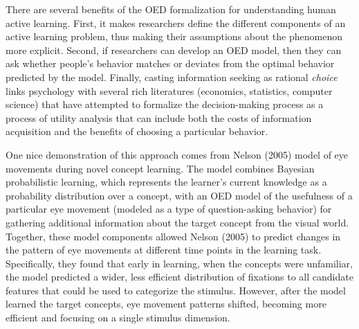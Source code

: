 \documentclass[english,man]{apa6}
\theoremstyle{definition}
\theoremstyle{definition}
\theoremstyle{definition}
\theoremstyle{remark}
\begin{document}
There are several benefits of the OED formalization for understanding
human active learning. First, it makes researchers define the different
components of an active learning problem, thus making their assumptions
about the phenomenon more explicit. Second, if researchers can develop
an OED model, then they can ask whether people's behavior matches or
deviates from the optimal behavior predicted by the model. Finally,
casting information seeking as rational \emph{choice} links psychology
with several rich literatures (economics, statistics, computer science)
that have attempted to formalize the decision-making process as a
process of utility analysis that can include both the costs of
information acquisition and the benefits of choosing a particular
behavior.

One nice demonstration of this approach comes from Nelson (2005) model
of eye movements during novel concept learning. The model combines
Bayesian probabilistic learning, which represents the learner's current
knowledge as a probability distribution over a concept, with an OED
model of the usefulness of a particular eye movement (modeled as a type
of question-asking behavior) for gathering additional information about
the target concept from the visual world. Together, these model
components allowed Nelson (2005) to predict changes in the pattern of
eye movements at different time points in the learning task.
Specifically, they found that early in learning, when the concepts were
unfamiliar, the model predicted a wider, less efficient distribution of
fixations to all candidate features that could be used to categorize the
stimulus. However, after the model learned the target concepts, eye
movement patterns shifted, becoming more efficient and focusing on a
single stimulus dimension.
\end{document}
